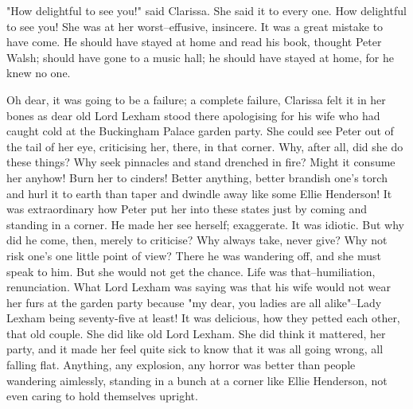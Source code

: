 \documentclass[lang=cn,10pt]{elegantbook}
\begin{document}
"How delightful to see you!" said Clarissa.  She said it to every
one.  How delightful to see you!  She was at her worst--effusive,
insincere.  It was a great mistake to have come.  He should have
stayed at home and read his book, thought Peter Walsh; should have
gone to a music hall; he should have stayed at home, for he knew no
one.

Oh dear, it was going to be a failure; a complete failure, Clarissa
felt it in her bones as dear old Lord Lexham stood there
apologising for his wife who had caught cold at the Buckingham
Palace garden party.  She could see Peter out of the tail of her
eye, criticising her, there, in that corner.  Why, after all, did
she do these things?  Why seek pinnacles and stand drenched in
fire?  Might it consume her anyhow!  Burn her to cinders!  Better
anything, better brandish one's torch and hurl it to earth than
taper and dwindle away like some Ellie Henderson!  It was
extraordinary how Peter put her into these states just by coming
and standing in a corner.  He made her see herself; exaggerate.  It
was idiotic.  But why did he come, then, merely to criticise?  Why
always take, never give?  Why not risk one's one little point of
view?  There he was wandering off, and she must speak to him.  But
she would not get the chance.  Life was that--humiliation,
renunciation.  What Lord Lexham was saying was that his wife would
not wear her furs at the garden party because "my dear, you ladies
are all alike"--Lady Lexham being seventy-five at least!  It was
delicious, how they petted each other, that old couple.  She did
like old Lord Lexham.  She did think it mattered, her party, and it
made her feel quite sick to know that it was all going wrong, all
falling flat.  Anything, any explosion, any horror was better than
people wandering aimlessly, standing in a bunch at a corner like
Ellie Henderson, not even caring to hold themselves upright.
\end{document}
